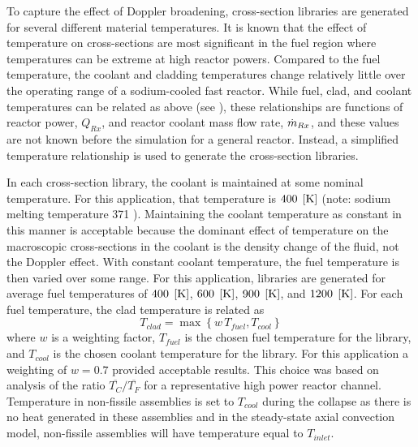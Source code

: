     To capture the effect of Doppler broadening, cross-section libraries are
    generated for several different material temperatures.
    It is known that the effect of temperature on cross-sections are most
    significant in the fuel region where temperatures can be extreme at high
    reactor powers. Compared to the fuel temperature, the coolant and cladding
    temperatures change relatively little over the operating range of a
    sodium-cooled fast reactor.
    While fuel, clad, and coolant temperatures can be related as above (see
    ), these
    relationships are functions of reactor power, $Q_{Rx}$, and reactor 
    coolant mass flow rate, $\dot{m}_{Rx}$, and these values are not known before 
    the simulation for a general reactor. Instead, a simplified temperature 
    relationship is used to generate the cross-section libraries.

    In each cross-section library, the coolant is maintained at some nominal
    temperature. For this application, that temperature is $400 \;\left[\text{{K}}\right]$
    (note: sodium melting temperature 371 ). Maintaining the coolant
    temperature as constant in this manner
    is acceptable because the dominant effect of temperature on the macroscopic
    cross-sections in the coolant is the density change of the fluid, not the
    Doppler effect. With constant coolant temperature, the fuel temperature is
    then varied over some range. For this application, libraries are generated
    for average fuel temperatures of 
    $400 \;\left[\text{{K}}\right]$, $600 \;\left[\text{{K}}\right]$, $900 \;\left[\text{{K}}\right]$, and $1200 \;\left[\text{{K}}\right]$. For
    each fuel temperature, the clad temperature is related as 
    \begin{equation}
      T_{clad} = \max \left\{ w \, T_{fuel}, T_{cool} \right\}
    \end{equation}
    where $w$ is a weighting factor, $T_{fuel}$ is the chosen fuel temperature
    for the library, and $T_{cool}$ is the chosen coolant temperature for the
    library. For this 
    application a weighting of $w=0.7$ provided acceptable results. This choice
    was based on analysis of the ratio $\overline{T_C}/\overline{T_F}$ for a
    representative high power reactor channel. Temperature
    in non-fissile assemblies is set to $T_{cool}$ during the collapse as there
    is no heat generated in these assemblies and in the steady-state axial
    convection model, non-fissile assemblies will have temperature equal to 
    $T_{inlet}$.

